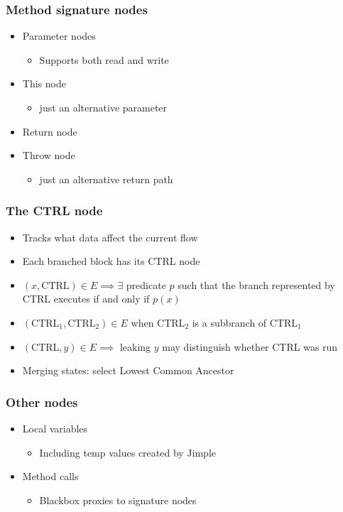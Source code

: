 \documentclass{beamer}
\begin{document}
\begin{frame}
  \frametitle{Method signature nodes}
  \begin{itemize}
    \item Parameter nodes
      \begin{itemize}
        \item Supports both read and write
      \end{itemize}
    \item This node
      \begin{itemize}
        \item just an alternative parameter
      \end{itemize}
    \item Return node
    \item Throw node
      \begin{itemize}
        \item just an alternative return path
      \end{itemize}
  \end{itemize}
\end{frame}

\begin{frame}
  \frametitle{The CTRL node}
  \begin{itemize}
    \item Tracks what data affect the current flow
    \item Each branched block has its CTRL node
    \item $(x, \text{CTRL}) \in E \implies \exists$ predicate $p$ such that
      the branch represented by CTRL executes if and only if $p(x)$
    \item $(\text{CTRL}_1, \text{CTRL}_2) \in E$ when
      $\text{CTRL}_2$ is a subbranch of $\text{CTRL}_1$
    \item $(\text{CTRL}, y) \in E \implies$ leaking $y$ may distinguish whether CTRL was run
    \item Merging states: select Lowest Common Ancestor
  \end{itemize}
\end{frame}

\begin{frame}
  \frametitle{Other nodes}
  \begin{itemize}
    \item Local variables
      \begin{itemize}
        \item Including temp values created by Jimple
      \end{itemize}
    \item Method calls
      \begin{itemize}
        \item Blackbox proxies to signature nodes
      \end{itemize}
  \end{itemize}
\end{frame}
\end{document}
